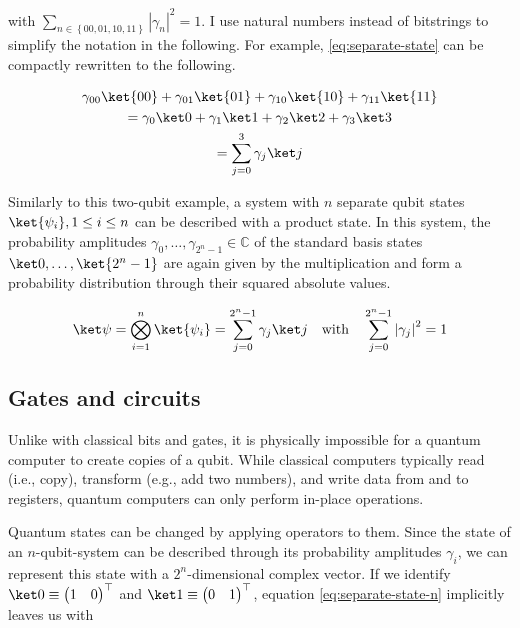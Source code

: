 with $\sum_{n \in \left\{00, 01, 10, 11\right\}} \left|\gamma_n\right|^2 = 1$.
I use natural numbers instead of bitstrings to simplify the notation in the
following.
For example, \autoref{eq:separate-state} can be compactly rewritten to the
following.

\begin{equation}
    \label{eq:separate-state-natural-numbers}
    \begin{gathered}
            \gamma_{00} \ket{00} + \gamma_{01} \ket{01} + \gamma_{10} \ket{10} + \gamma_{11} \ket{11}\\
        =   \gamma_0 \ket 0 + \gamma_1 \ket 1 + \gamma_2 \ket 2 + \gamma_3 \ket 3\\
        =   \sum_{j=0}^3 \gamma_j \ket j
    \end{gathered}
\end{equation}

Similarly to this two-qubit example, a system with $n$ separate qubit states
$\ket{\psi_i}, 1 \leq i \leq n$ can be described with a product state.
In this system, the probability amplitudes
$\gamma_0, \dots, \gamma_{2^n -1} \in \mathbb C$ of the standard basis states
$\ket 0, \dots, \ket{2^n -1}$ are again given by the multiplication and form a
probability distribution through their squared absolute values.

\begin{equation}
    \label{eq:separate-state-n}
    \ket\psi = \bigotimes_{i=1}^n \ket{\psi_i} = \sum_{j=0}^{2^n -1} \gamma_j \ket j
        \quad\text{with}\quad \sum_{j=0}^{2^n -1} \left|\gamma_j\right|^2 = 1
\end{equation}

\subsection{Gates and circuits}

Unlike with classical bits and gates, it is physically impossible for a quantum
computer to create copies of a qubit.
While classical computers typically read (i.e., copy), transform (e.g., add two
numbers), and write data from and to registers, quantum computers can only
perform in-place operations.

Quantum states can be changed by applying operators to them.
Since the state of an $n$-qubit-system can be described through its probability
amplitudes $\gamma_i$, we can represent this state with a $2^n$-dimensional
complex vector.
If we identify $\ket 0 \equiv \begin{pmatrix}1 & 0\end{pmatrix}^\top$ and
$\ket 1 \equiv \begin{pmatrix}0 & 1\end{pmatrix}^\top$,
equation \ref{eq:separate-state-n} implicitly leaves us with

